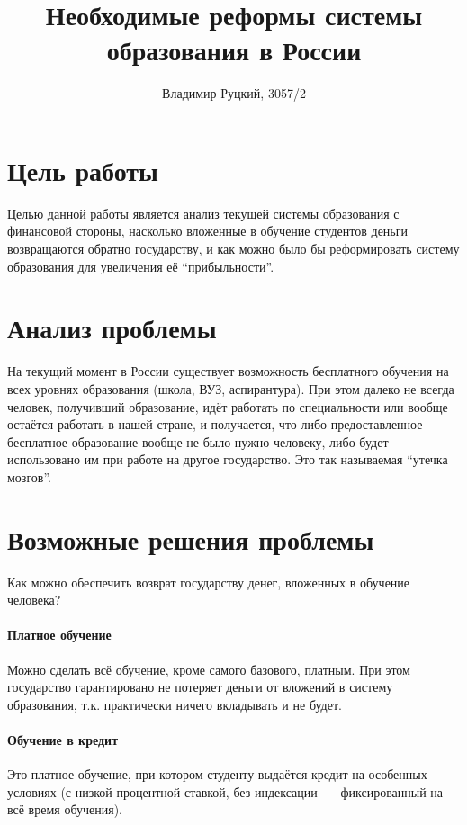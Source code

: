 \documentclass[10pt,a4paper,titlepage]{article}
\title{Необходимые реформы системы образования в России}
\author{Владимир Руцкий, 3057/2}
\begin{document}
\titlepage
\maketitle

\section*{Цель работы}
Целью данной работы является анализ текущей системы образования с финансовой стороны, 
насколько вложенные в обучение студентов деньги возвращаются обратно государству, 
и как можно было бы реформировать систему образования для увеличения её ``прибыльности''.

\section*{Анализ проблемы}
На текущий момент в России существует возможность бесплатного обучения на всех уровнях образования 
(школа, ВУЗ, аспирантура).
При этом далеко не всегда человек, получивший образование, 
идёт работать по специальности или вообще остаётся работать в нашей стране, 
и получается, что либо предоставленное бесплатное образование вообще не было нужно человеку, 
либо будет использовано им при работе на другое государство.
Это так называемая ``утечка мозгов''. %

\section*{Возможные решения проблемы}
Как можно обеспечить возврат государству денег, вложенных в обучение человека?

\paragraph{Платное обучение} 
Можно сделать всё обучение, кроме самого базового, платным. 
При этом государство гарантировано не потеряет деньги от вложений в систему образования, 
т.к. практически ничего вкладывать и не будет.

\paragraph{Обучение в кредит}
Это платное обучение, при котором студенту выдаётся кредит на особенных условиях
(с низкой процентной ставкой, без индексации~--- фиксированный на всё время обучения).
\end{document}
